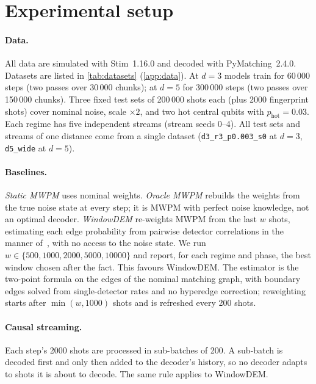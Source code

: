\documentclass[11pt,a4paper]{article}
\newcommand{\code}[1]{\texttt{#1}}
\begin{document}
\section{Experimental setup}\label{sec:setup}

\paragraph{Data.}
All data are simulated with Stim~1.16.0 and decoded with PyMatching~2.4.0. Datasets are listed in
\cref{tab:datasets} (\cref{app:data}). At $d=3$ models train for 60\,000 steps (two passes over 30\,000 chunks);
at $d=5$ for 300\,000 steps (two passes over 150\,000 chunks). Three fixed test sets of 200\,000 shots each (plus
2000 fingerprint shots) cover nominal noise, scale $\times2$, and two hot central qubits with
$p_{\mathrm{hot}}=0.03$. Each regime has five independent streams (stream seeds 0--4). All test sets and streams of
one distance come from a single dataset (\code{d3\_r3\_p0.003\_s0} at $d=3$, \code{d5\_wide} at $d=5$).

\paragraph{Baselines.}
\emph{Static MWPM} uses nominal weights. \emph{Oracle MWPM} rebuilds the weights from the true noise state at
every step; it is MWPM with perfect noise knowledge, not an optimal decoder. \emph{WindowDEM} re-weights MWPM from
the last $w$ shots, estimating each edge probability from pairwise detector correlations in the manner
of~\cite{spitz2018adaptive}, with no access to the noise state. We run $w\in\{500,1000,2000,5000,10000\}$ and
report, for each regime and phase, the best window chosen after the fact. This favours WindowDEM. The estimator is
the two-point formula on the edges of the nominal matching graph, with boundary edges solved from single-detector
rates and no hyperedge correction; reweighting starts after $\min(w,1000)$ shots and is refreshed every 200 shots.

\paragraph{Causal streaming.}
Each step's 2000 shots are processed in sub-batches of 200. A sub-batch is decoded first and only then added to
the decoder's history, so no decoder adapts to shots it is about to decode. The same rule applies to WindowDEM.
\end{document}
